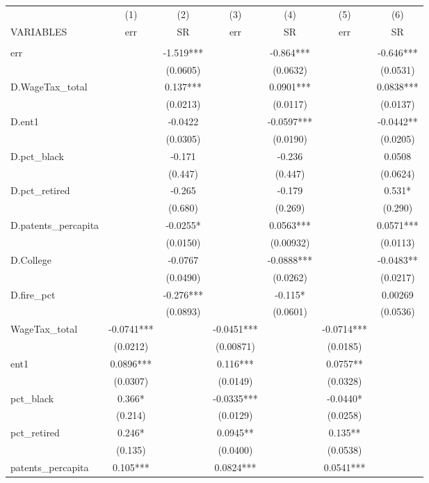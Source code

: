 \begin{tabular}{lcccccc} \hline
 & (1) & (2) & (3) & (4) & (5) & (6) \\
VARIABLES & err & SR & err & SR & err & SR \\ \hline
 &  &  &  &  &  &  \\
err &  & -1.519*** &  & -0.864*** &  & -0.646*** \\
 &  & (0.0605) &  & (0.0632) &  & (0.0531) \\
D.WageTax\_total &  & 0.137*** &  & 0.0901*** &  & 0.0838*** \\
 &  & (0.0213) &  & (0.0117) &  & (0.0137) \\
D.ent1 &  & -0.0422 &  & -0.0597*** &  & -0.0442** \\
 &  & (0.0305) &  & (0.0190) &  & (0.0205) \\
D.pct\_black &  & -0.171 &  & -0.236 &  & 0.0508 \\
 &  & (0.447) &  & (0.447) &  & (0.0624) \\
D.pct\_retired &  & -0.265 &  & -0.179 &  & 0.531* \\
 &  & (0.680) &  & (0.269) &  & (0.290) \\
D.patents\_percapita &  & -0.0255* &  & 0.0563*** &  & 0.0571*** \\
 &  & (0.0150) &  & (0.00932) &  & (0.0113) \\
D.College &  & -0.0767 &  & -0.0888*** &  & -0.0483** \\
 &  & (0.0490) &  & (0.0262) &  & (0.0217) \\
D.fire\_pct &  & -0.276*** &  & -0.115* &  & 0.00269 \\
 &  & (0.0893) &  & (0.0601) &  & (0.0536) \\
WageTax\_total & -0.0741*** &  & -0.0451*** &  & -0.0714*** &  \\
 & (0.0212) &  & (0.00871) &  & (0.0185) &  \\
ent1 & 0.0896*** &  & 0.116*** &  & 0.0757** &  \\
 & (0.0307) &  & (0.0149) &  & (0.0328) &  \\
pct\_black & 0.366* &  & -0.0335*** &  & -0.0440* &  \\
 & (0.214) &  & (0.0129) &  & (0.0258) &  \\
pct\_retired & 0.246* &  & 0.0945** &  & 0.135** &  \\
 & (0.135) &  & (0.0400) &  & (0.0538) &  \\
patents\_percapita & 0.105*** &  & 0.0824*** &  & 0.0541*** &  \\

\end{tabular}
